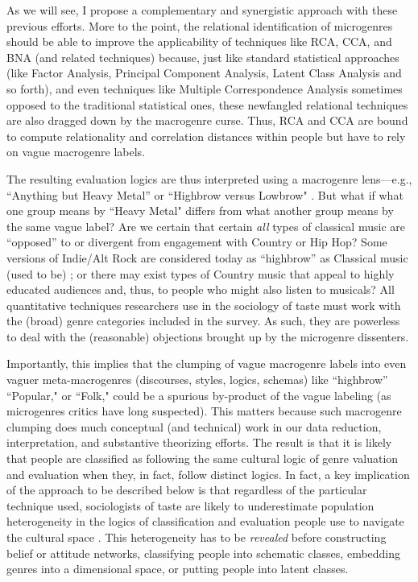 \documentclass[a4paper,12pt]{extarticle}
\begin{document}
As we will see, I propose a complementary and synergistic approach with these previous efforts. More to the point, the relational identification of microgenres should be able to improve the applicability of techniques like RCA, CCA, and BNA (and related techniques) because, just like standard statistical approaches (like Factor Analysis, Principal Component Analysis, Latent Class Analysis and so forth), and even techniques like Multiple Correspondence Analysis sometimes opposed to the traditional statistical ones, these newfangled relational techniques are also dragged down by the macrogenre curse. Thus, RCA and CCA are bound to compute relationality and correlation distances within people but have to rely on vague macrogenre labels. 

The resulting evaluation logics are thus interpreted using a macrogenre lens---e.g., ``Anything but Heavy Metal'' or ``Highbrow versus Lowbrow" \citep[e.g.,][]{goldberg2011mapping, willekens2022cultural}. But what if what one group means by ``Heavy Metal" differs from what another group means by the same vague label? Are we certain that certain {\em all} types of classical music are ``opposed'' to or divergent from engagement with Country or Hip Hop? Some versions of Indie/Alt Rock are considered today as ``highbrow'' as Classical music (used to be) \citep{Van_Poecke2018}; or there may exist types of Country music that appeal to highly educated audiences and, thus, to people who might also listen to musicals? All quantitative techniques researchers use in the sociology of taste must work with the (broad) genre categories included in the survey. As such, they are powerless to deal with the (reasonable) objections brought up by the microgenre dissenters. 

Importantly, this implies that the clumping of vague macrogenre labels into even vaguer meta-macrogenres (discourses, styles, logics, schemas) like ``highbrow'' ``Popular," or ``Folk," could be a spurious by-product of the vague labeling (as microgenres critics have long suspected). This matters because such macrogenre clumping does much conceptual (and technical) work in our data reduction, interpretation, and substantive theorizing efforts. The result is that it is likely that people are classified as following the same cultural logic of genre valuation and evaluation when they, in fact, follow distinct logics. In fact, a key implication of the approach to be described below is that regardless of the particular technique used, sociologists of taste are likely to underestimate population heterogeneity in the logics of classification and evaluation people use to navigate the cultural space \citep{lahire2008individual}. This heterogeneity has to be {\em revealed} before constructing belief or attitude networks, classifying people into schematic classes, embedding genres into a dimensional space, or putting people into latent classes.
\end{document}
